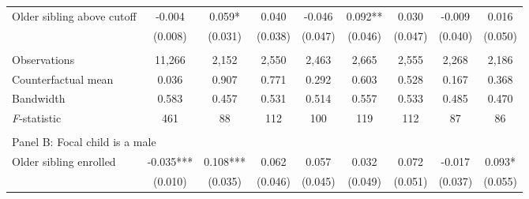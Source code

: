 \begin{table}[!htbp]
{{\begin{tabular}{lcccccccc}
Older sibling above cutoff&      -0.004   &       0.059*  &       0.040   &      -0.046   &       0.092** &       0.030   &      -0.009   &       0.016   \\
                    &     (0.008)   &     (0.031)   &     (0.038)   &     (0.047)   &     (0.046)   &     (0.047)   &     (0.040)   &     (0.050)   \\
                    &               &               &               &               &               &               &               &               \\
Observations        &      11,266   &       2,152   &       2,550   &       2,463   &       2,665   &       2,555   &       2,268   &       2,186   \\
Counterfactual mean &       0.036   &       0.907   &       0.771   &       0.292   &       0.603   &       0.528   &       0.167   &       0.368   \\
Bandwidth           &       0.583   &       0.457   &       0.531   &       0.514   &       0.557   &       0.533   &       0.485   &       0.470   \\
\textit{F}-statistic&         461   &          88   &         112   &         100   &         119   &         112   &          87   &          86   \\
 
&  &  &  &  \\
\multicolumn{10}{l}{Panel B: Focal child is a male} \\
Older sibling enrolled&      -0.035***&       0.108***&       0.062   &       0.057   &       0.032   &       0.072   &      -0.017   &       0.093*  \\
                    &     (0.010)   &     (0.035)   &     (0.046)   &     (0.045)   &     (0.049)   &     (0.051)   &     (0.037)   &     (0.055)   \\
 

\end{tabular}}}
\end{table}
